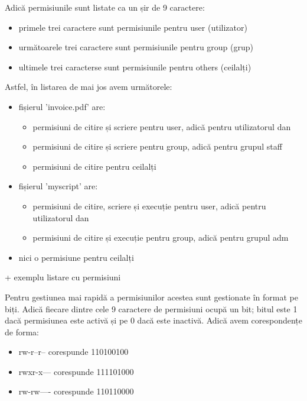Adică permisiunile sunt listate ca un șir de 9 caractere:

\begin{itemize}
	\item primele trei caractere sunt permisiunile pentru user (utilizator)
	\item următoarele trei caractere sunt permisiunile pentru group (grup)
	\item ultimele trei caracterse sunt permisiunile pentru others (ceilalți)
\end{itemize}

Astfel, în listarea de mai jos avem următorele:

\begin{itemize}
	\item fișierul 'invoice.pdf' are:
	\begin{itemize}
		\item permisiuni de citire și scriere pentru user, adică pentru
			utilizatorul dan
		\item permisiuni de citire și scriere pentru group, adică pentru
			grupul staff
		\item permisiuni de citire pentru ceilalți
	\end{itemize}
	\item fișierul 'myscript' are:
	\begin{itemize}
		\item permisiuni de citire, scriere și execuție pentru user,
			adică pentru utilizatorul dan
		\item permisiuni de citire și execuție pentru group, adică
			pentru grupul adm
	\end{itemize}
	\item nici o permisiune pentru ceilalți
\end{itemize}

+ exemplu listare cu permisiuni

Pentru gestiunea mai rapidă a permisiunilor acestea sunt gestionate în format pe
biți. Adică fiecare dintre cele 9 caractere de permisiuni ocupă un bit; bitul
este 1 dacă permisiunea este activă și pe 0 dacă este inactivă. Adică avem
corespondențe de forma:

\begin{itemize}
	\item rw-r--r-- corespunde 110100100
	\item rwxr-x--- corespunde 111101000
	\item rw-rw---- corespunde 110110000
\end{itemize}

